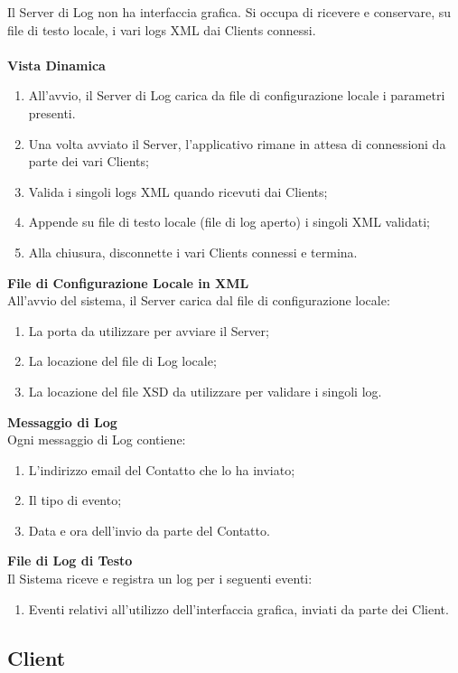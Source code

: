 \documentclass[a4paper, 11pt]{article} %
\begin{document}
Il Server di Log non ha interfaccia grafica. Si occupa di ricevere e conservare, su file di testo locale, i vari logs XML dai Clients connessi.\\
\\
\textbf{Vista Dinamica}
\begin{enumerate}
\item All'avvio, il Server di Log carica da file di configurazione locale i parametri presenti. 
\item Una volta avviato il Server, l'applicativo rimane in attesa di connessioni da parte dei vari Clients;
\item Valida i singoli logs XML quando ricevuti dai Clients;
\item Appende su file di testo locale (file di log aperto) i singoli XML validati;
\item Alla chiusura, disconnette i vari Clients connessi e termina.
\end{enumerate}
\vspace{0.5cm}
\textbf{File di Configurazione Locale in XML}\\
All'avvio del sistema, il Server carica dal file di configurazione locale:
\begin{enumerate}
\item La porta da utilizzare per avviare il Server;
\item La locazione del file di Log locale;
\item La locazione del file XSD da utilizzare per validare i singoli log.
\end{enumerate}
\vspace{0.5cm}
\textbf{Messaggio di Log}\\
Ogni messaggio di Log contiene:
\begin{enumerate}
\item L'indirizzo email del Contatto che lo ha inviato;
\item Il tipo di evento;
\item Data e ora dell'invio da parte del Contatto.
\end{enumerate}
\vspace{0.5cm}
\textbf{File di Log di Testo}\\
Il Sistema riceve e registra un log per i seguenti eventi:
\begin{enumerate}
\item Eventi relativi all'utilizzo dell'interfaccia grafica, inviati da parte dei Client.
\end{enumerate}

\subsection{Client}
\end{document}
